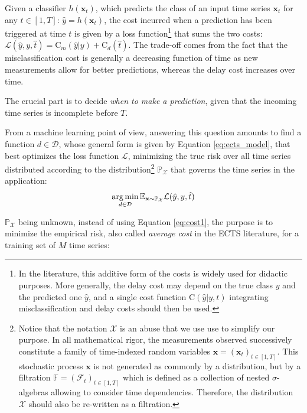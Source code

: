 \documentclass[sigconf, nonacm, table]{acmart}
\DeclareMathOperator*{\argmin}{arg\,min}
\begin{document}
Given a classifier $h(\mathbf{x}_t)$, which predicts the class of an input time series $\mathbf{x}_t$ for any $t \in [1, T]$: $\hat{y}=h(\mathbf{x}_t)$, the cost incurred when a prediction has been triggered at time $t$ is given by a loss function\footnote{In the literature, this additive form of the costs is widely used for didactic purposes. More generally, the delay cost may depend on the true class $y$ and the predicted one $\hat{y}$, and a single cost function $\mathrm{C}(\hat{y}|y, t)$ integrating misclassification and delay costs should then be used.} that sums the two costs: $\mathcal{L}(\hat{y}, y, \hat{t}) = \mathrm{C}_m(\hat{y}|y) +  \mathrm{C}_d(\hat{t})$. The trade-off comes from the fact that the misclassification cost is generally a decreasing function of time as new measurements allow for better predictions, whereas the delay cost increases over time. 

The crucial part is to decide \textit{when to make a prediction}, given that the incoming time series is incomplete before $T$. %


From a machine learning point of view, answering this question amounts to find a function $d \in {\mathcal{D}}$, whose general form is given by Equation \ref{eq:ects_model}, that best optimizes the loss function $\mathcal{L}$, minimizing the true risk over all time series distributed according to the distribution\footnote{
Notice that the notation $\mathcal{X}$ is an abuse that we use use to simplify our purpose. In all mathematical rigor, the measurements observed successively constitute a family of time-indexed random variables $\mathbf{x} = (\mathbf{x}_t)_{t \in [1,T]}$. This stochastic process $\mathbf{x}$ is not generated as commonly by a distribution, but by a filtration $\mathbb{F} = (\mathcal{F}_t)_{t \in [1,T]}$ which is defined as a collection of nested $\sigma$-algebras \cite{klenke2013} allowing to consider time dependencies. Therefore, the distribution $\mathcal{X}$ should also be re-written as a filtration.
}
$\mathbb{P}_{\mathcal{X}}$ that governs the time series in the application:
\begin{equation}
    \small 
        \normalsize
        \argmin_{d \in \mathcal{D}} \mathbb{E}_{\mathbf{x} \sim \mathbb{P}_{\mathcal{X}}} \mathcal{L}(\hat{y}, y, \hat{t})
        \label{eq:cost1}
\end{equation}

$\mathbb{P}_{\mathcal X}$ being unknown, instead of using Equation \ref{eq:cost1},
the purpose is to minimize the empirical risk, also called \textit{average cost} in the ECTS literature, for a training set of $M$ time series:
\end{document}
